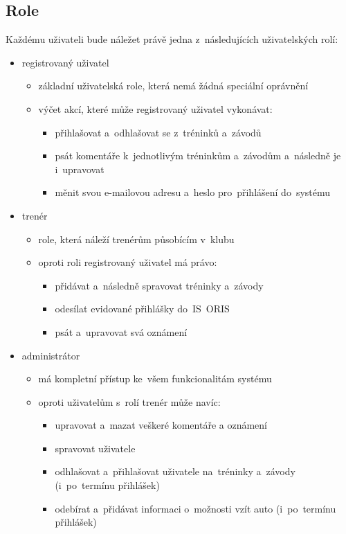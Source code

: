 \subsection{Role}
\label{section:role}
Každému uživateli bude náležet právě jedna z~následujících uživatelských rolí:
\begin{itemize}
	\item registrovaný uživatel
	\begin{itemize}
		\item základní uživatelská role, která nemá žádná speciální oprávnění
		\item výčet akcí, které může registrovaný uživatel vykonávat:
		\begin{itemize}
			\item přihlašovat a~odhlašovat se z~tréninků a~závodů
			\item psát komentáře k~jednotlivým tréninkům a~závodům a~následně je i~upravovat
			\item měnit svou e-mailovou adresu a~heslo pro~přihlášení do~systému
		\end{itemize}
	\end{itemize}
	\item trenér
	\begin{itemize}
		\item role, která náleží trenérům působícím v~klubu
		\item oproti roli registrovaný uživatel má právo:
		\begin{itemize}
			\item přidávat a~následně spravovat tréninky a~závody
			\item odesílat evidované přihlášky do~IS~ORIS
			\item psát a~upravovat svá oznámení
		\end{itemize}
	\end{itemize}
	\item administrátor
	\begin{itemize}
		\item má kompletní přístup ke~všem funkcionalitám systému
		\item oproti uživatelům s~rolí trenér může navíc:
		\begin{itemize}
			\item upravovat a~mazat veškeré komentáře a oznámení
			\item spravovat uživatele
			\item odhlašovat a~přihlašovat uživatele na~tréninky a~závody (i~po~termínu přihlášek)
			\item odebírat a~přidávat informaci o~možnosti vzít auto (i~po~termínu přihlášek)
		\end{itemize}
	\end{itemize}
\end{itemize}
